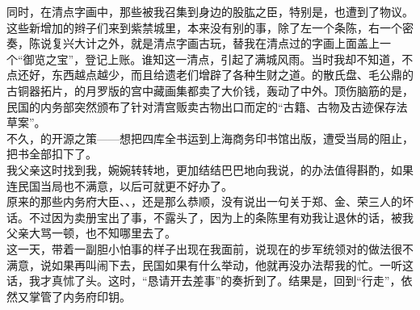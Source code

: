 同时，在清点字画中，那些被我召集到身边的股肱之臣，特别是，也遭到了物议。这些新增加的辫子们来到紫禁城里，本来没有别的事，除了左一个条陈，右一个密奏，陈说复兴大计之外，就是清点字画古玩，替我在清点过的字画上面盖上一个“御览之宝”，登记上账。谁知这一清点，引起了满城风雨。当时我却不知道，不点还好，东西越点越少，而且给遗老们增辟了各种生财之道。的散氏盘、毛公鼎的古铜器拓片，的月罗版的宫中藏画集都卖了大价钱，轰动了中外。顶伤脑筋的是，民国的内务部突然颁布了针对清宫贩卖古物出口而定的“古籍、古物及古迹保存法草案”。\\

不久，的开源之策——想把四库全书运到上海商务印书馆出版，遭受当局的阻止，把书全部扣下了。\\

我父亲这时找到我，婉婉转转地，更加结结巴巴地向我说，的办法值得斟酌，如果连民国当局也不满意，以后可就更不好办了。\\

原来的那些内务府大臣、、，还是那么恭顺，没有说出一句关于郑、金、荣三人的坏话。不过因为卖册宝出了事，不露头了，因为上的条陈里有劝我让退休的话，被我父亲大骂一顿，也不知哪里去了。\\

这一天，带着一副胆小怕事的样子出现在我面前，说现在的步军统领对的做法很不满意，说如果再叫闹下去，民国如果有什么举动，他就再没办法帮我的忙。一听这话，我才真怵了头。这时，“恳请开去差事”的奏折到了。结果是，回到“行走”，依然又掌管了内务府印钥。
